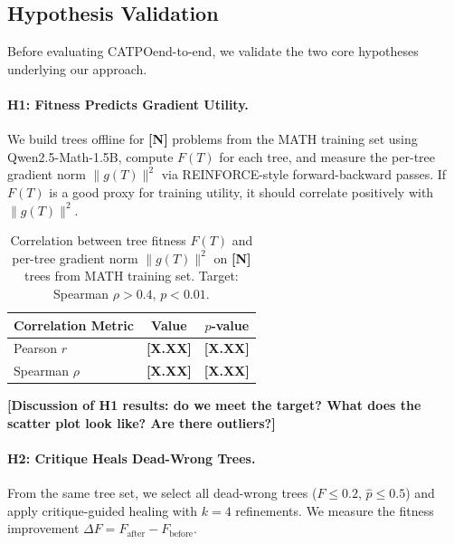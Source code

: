 \documentclass{article} %
\newcommand{\CATPO}{\textsc{CATPO}}
\newcommand{\placeholder}[1]{{\color{red}\textbf{[#1]}}}
\begin{document}
\subsection{Hypothesis Validation}

Before evaluating \CATPO end-to-end, we validate the two core hypotheses underlying our approach.

\paragraph{H1: Fitness Predicts Gradient Utility.}

We build trees offline for \placeholder{N} problems from the MATH training set using Qwen2.5-Math-1.5B, compute $F(T)$ for each tree, and measure the per-tree gradient norm $\|g(T)\|^2$ via REINFORCE-style forward-backward passes. If $F(T)$ is a good proxy for training utility, it should correlate positively with $\|g(T)\|^2$.

\begin{table}[h]
\centering
\begin{tabular}{lcc}
\toprule
\textbf{Correlation Metric} & \textbf{Value} & \textbf{$p$-value} \\
\midrule
Pearson $r$ & \placeholder{X.XX} & \placeholder{X.XX} \\
Spearman $\rho$ & \placeholder{X.XX} & \placeholder{X.XX} \\
\bottomrule
\end{tabular}
\caption{Correlation between tree fitness $F(T)$ and per-tree gradient norm $\|g(T)\|^2$ on \placeholder{N} trees from MATH training set. Target: Spearman $\rho > 0.4$, $p < 0.01$.}
\label{tab:h1}
\end{table}

\placeholder{Discussion of H1 results: do we meet the target? What does the scatter plot look like? Are there outliers?}

\paragraph{H2: Critique Heals Dead-Wrong Trees.}

From the same tree set, we select all dead-wrong trees ($F \le 0.2$, $\hat{p} \le 0.5$) and apply critique-guided healing with $k=4$ refinements. We measure the fitness improvement $\Delta F = F_\text{after} - F_\text{before}$.
\end{document}

